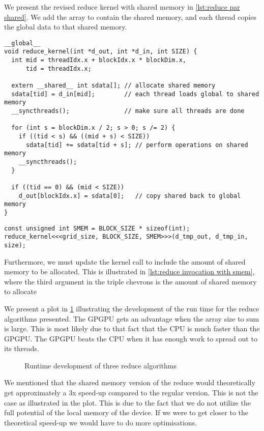 We present the revised reduce kernel with shared memory in \cref{lst:reduce par shared}.
We add the  array to contain the shared memory, and each thread copies the global data to that shared memory.


\begin{lstlisting}[caption={Reduce kernel using shared memory}, label={lst:reduce par shared}]
__global__
void reduce_kernel(int *d_out, int *d_in, int SIZE) {
  int mid = threadIdx.x + blockIdx.x * blockDim.x,
      tid = threadIdx.x;

  extern __shared__ int sdata[]; // allocate shared memory
  sdata[tid] = d_in[mid];        // each thread loads global to shared memory
  __syncthreads();               // make sure all threads are done

  for (int s = blockDim.x / 2; s > 0; s /= 2) {
    if ((tid < s) && ((mid + s) < SIZE))
      sdata[tid] += sdata[tid + s]; // perform operations on shared memory
    __syncthreads();
  }

  if ((tid == 0) && (mid < SIZE))
    d_out[blockIdx.x] = sdata[0];   // copy shared back to global memory
}
\end{lstlisting}

\begin{lstlisting}[caption={Updated call to reduce kernel after use of shared memory}, label={lst:reduce invocation with smem}]
const unsigned int SMEM = BLOCK_SIZE * sizeof(int);
reduce_kernel<<<grid_size, BLOCK_SIZE, SMEM>>>(d_tmp_out, d_tmp_in, size);
\end{lstlisting}

Furthermore, we must update the kernel call to include the amount of shared memory to be allocated.
This is illustrated in \cref{lst:reduce invocation with smem}, where the third argument in the triple chevrons is the amount of shared memory to allocate

We present a plot in \cref{fig:reduce plot} illustrating the development of the run time for the reduce algorithms presented.
The GPGPU gets an advantage when the array size to sum is large.
This is most likely due to that fact that the CPU is much faster than the GPGPU.
The GPGPU beats the CPU when it has enough work to spread out to its threads.

\begin{figure}[htb]
  \centering
  
  \caption{Runtime development of three reduce algorithms}
  \label{fig:reduce plot}
\end{figure}

We mentioned that the shared memory version of the reduce would theoretically get approximately a 3x speed-up compared to the regular version.
This is not the case as illustrated in the plot.
This is due to the fact that we do not utilize the full potential of the local memory of the device.
If we were to get closer to the theoretical speed-up we would have to do more optimisations.

